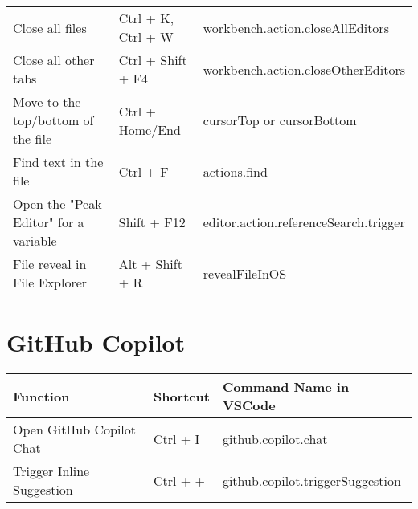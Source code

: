 \documentclass{article}
\begin{document}
\begin{longtable}{|p{6cm}|p{3cm}|p{7cm}|}
Close all files & Ctrl + K, Ctrl + W & workbench.action.closeAllEditors \\
Close all other tabs & Ctrl + Shift + F4 & workbench.action.closeOtherEditors \\
Move to the top/bottom of the file & Ctrl + Home/End & cursorTop or cursorBottom \\
Find text in the file & Ctrl + F & actions.find \\
Open the "Peak Editor" for a variable & Shift + F12 & editor.action.referenceSearch.trigger \\
File reveal in File Explorer & Alt + Shift + R & revealFileInOS \\
\hline
\end{longtable}

\section*{GitHub Copilot}
\begin{longtable}{|p{6cm}|p{3cm}|p{7cm}|}
\hline
\rowcolor{white}
\textbf{Function} & \textbf{Shortcut} & \textbf{Command Name in VSCode} \\
\hline
Open GitHub Copilot Chat & Ctrl + I & github.copilot.chat \\
Trigger Inline Suggestion & Ctrl + + & github.copilot.triggerSuggestion \\
\hline
\end{longtable}
\end{document}
